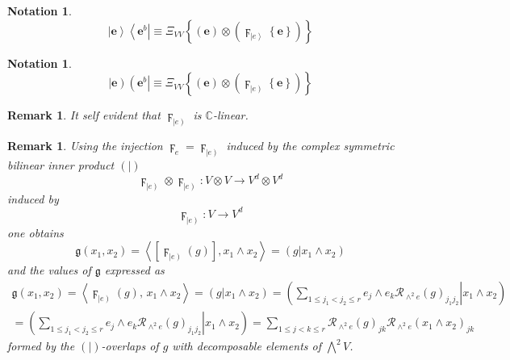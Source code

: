 \documentclass[aps,preprint]{revtex4}%
\newtheorem{notation}[theorem]{Notation}
\newtheorem{remark}[theorem]{Remark}
\begin{document}
\begin{notation}%
\begin{equation}
\left\vert \mathbf{e}\right\rangle \left\langle \mathbf{e}^{b}\right\vert
\equiv\Xi_{VV}\left\{  \left(  \mathbf{e}\right)  \otimes\left(
\digamma_{\left\vert e\right\rangle }\left\{  \mathbf{e}\right\}  \right)
\right\}
\end{equation}

\end{notation}

\begin{notation}%
\begin{equation}
\left\vert \mathbf{e}\right)  \left(  \mathbf{e}^{b}\right\vert \equiv\Xi
_{VV}\left\{  \left(  \mathbf{e}\right)  \otimes\left(  \digamma_{\left\vert
e\right)  }\left\{  \mathbf{e}\right\}  \right)  \right\}
\end{equation}

\end{notation}

\begin{remark}
It self evident that $\digamma_{\left\vert e\right)  }$ is $\mathbb{C}$-linear.
\end{remark}

\begin{remark}
Using the injection $\digamma_{e}=\digamma_{\left\vert e\right)  }$ induced by
the complex symmetric bilinear inner product $\left(  \left.  {}\right\vert
\right)  $%
\begin{equation}
\digamma_{\left\vert e\right)  }\otimes\digamma_{\left\vert e\right)
}:V\otimes V\rightarrow V^{d}\otimes V^{d}%
\end{equation}
induced by
\begin{equation}
\digamma_{\left\vert e\right)  }:V\rightarrow V^{d}%
\end{equation}
one obtains
\begin{equation}
\mathfrak{g}\left(  x_{1},x_{2}\right)  =\left\langle \left[  \digamma
_{\left\vert e\right)  }\left(  g\right)  \right]  ,x_{1}\wedge x_{2}%
\right\rangle =\left(  \left.  g\right\vert x_{1}\wedge x_{2}\right)
\end{equation}
and the values of $\mathfrak{g}$ expressed as
\begin{gather}
\mathfrak{g}\left(  x_{1},x_{2}\right)  =\left\langle \digamma_{\left\vert
e\right)  }\left(  g\right)  ,\,\overset{}{x_{1}\wedge x_{2}}\right\rangle
=\left(  \left.  \overset{}{g}\right\vert x_{1}\wedge x_{2}\right)  =\left(
\left.  \sum_{1\leq j_{1}<j_{2}\leq r}e_{j}\wedge e_{k}\mathcal{R}_{\wedge
^{2}e}\left(  g\right)  _{j_{1}j_{2}}\right\vert \overset{}{\overset{}{x_{1}%
\wedge x_{2}}}\right) \\
=\left(  \left.  \sum_{1\leq j_{1}<j_{2}\leq r}e_{j}\wedge e_{k}%
\mathcal{R}_{\wedge^{2}e}\left(  g\right)  _{j_{1}j_{2}}\right\vert
\overset{}{\overset{}{x_{1}\wedge x_{2}}}\right)  =\sum_{1\leq j<k\leq
r}\mathcal{R}_{\wedge^{2}e}\left(  g\right)  _{jk}\mathcal{R}_{\wedge^{2}%
e}\left(  x_{1}\wedge x_{2}\right)  _{jk}%
\end{gather}
formed by the $\left(  \left.  {}\right\vert \right)  $-overlaps of $g$ with
decomposable elements of $\bigwedge\nolimits^{2}V$.
\end{remark}
\end{document}
